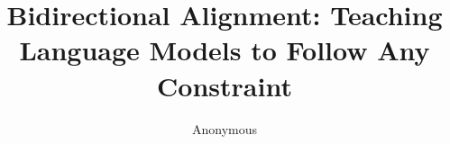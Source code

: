 \documentclass[10pt]{article}
\title{Bidirectional Alignment: Teaching Language Models to Follow Any Constraint}
\author{Anonymous}
\date{}
\begin{document}
\maketitle

\begin{abstract}

\end{abstract}











\end{document}

